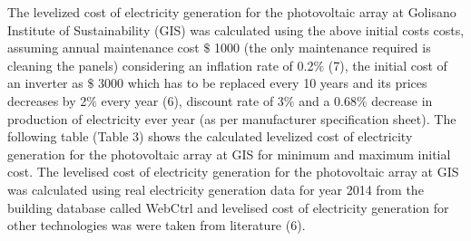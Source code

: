 \documentclass[12pt]{article}
\begin{document}


\vspace{\baselineskip}
\begin{justify}
The levelized cost of electricity generation for the photovoltaic array at Golisano Institute of Sustainability (GIS) was calculated using the above initial costs costs, assuming annual maintenance cost $\$$ 1000 (the only maintenance required is cleaning the panels) considering an inflation rate of 0.2$\%$  (7), the initial cost of an inverter as $\$$ 3000 which has to be replaced every 10 years and its prices decreases by 2$\%$  every year (6), discount rate of 3$\%$  and a 0.68$\%$  decrease in production of electricity ever year (as per manufacturer specification sheet). The following table (Table 3) shows the calculated levelized cost of electricity generation for the photovoltaic array at GIS for minimum and maximum initial cost. The levelised cost of electricity generation for the photovoltaic array at GIS was calculated using real electricity generation data for year 2014 from the building database called WebCtrl and levelised cost of electricity generation for other technologies was were taken from literature (6).
\end{justify}\par


\vspace{\baselineskip}
\par



\end{document}
